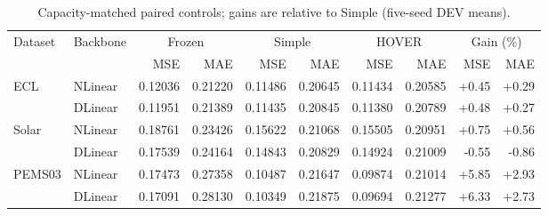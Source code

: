 \begin{table}[t]
\caption{Capacity-matched paired controls; gains are relative to Simple (five-seed DEV means).}
\label{tab:capacity}
\centering
\begingroup
\setlength{\tabcolsep}{1.0pt}
\renewcommand{\arraystretch}{1.23}
\fontsize{6.2}{7.4}\selectfont
\begin{tabular*}{\columnwidth}{@{\extracolsep{\fill}}ll|rr|rr|rr|rr@{}}
\toprule
\multirow{2}{*}{Dataset} & \multirow{2}{*}{Backbone} & \multicolumn{2}{c|}{Frozen} & \multicolumn{2}{c|}{Simple} & \multicolumn{2}{c|}{HOVER} & \multicolumn{2}{c}{Gain (\%)} \\
\cmidrule(lr){3-4}\cmidrule(lr){5-6}\cmidrule(lr){7-8}\cmidrule(lr){9-10}
 &  & MSE & MAE & MSE & MAE & MSE & MAE & MSE & MAE \\
\midrule
ECL & NLinear & 0.12036 & 0.21220 & 0.11486 & 0.20645 & 0.11434 & 0.20585 & +0.45 & +0.29 \\
 & DLinear & 0.11951 & 0.21389 & 0.11435 & 0.20845 & 0.11380 & 0.20789 & +0.48 & +0.27 \\
\midrule
Solar & NLinear & 0.18761 & 0.23426 & 0.15622 & 0.21068 & 0.15505 & 0.20951 & +0.75 & +0.56 \\
 & DLinear & 0.17539 & 0.24164 & 0.14843 & 0.20829 & 0.14924 & 0.21009 & -0.55 & -0.86 \\
\midrule
PEMS03 & NLinear & 0.17473 & 0.27358 & 0.10487 & 0.21647 & 0.09874 & 0.21014 & +5.85 & +2.93 \\
 & DLinear & 0.17091 & 0.28130 & 0.10349 & 0.21875 & 0.09694 & 0.21277 & +6.33 & +2.73 \\
\bottomrule
\end{tabular*}
\endgroup
\end{table}
